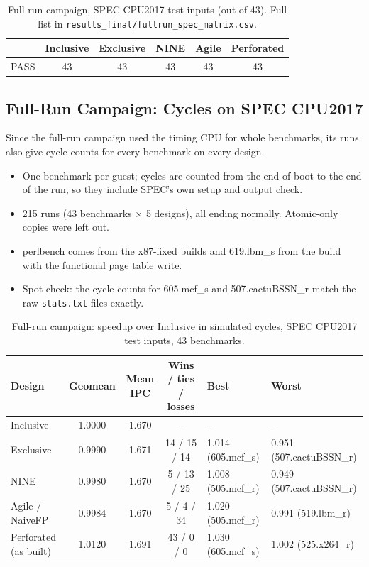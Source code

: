\begin{table}[H]
\centering
\small
\caption{Full-run campaign, SPEC CPU2017 test inputs (out of 43). Full list in \texttt{results\_final/fullrun\_spec\_matrix.csv}.}
\label{tab:fullrun_short}
\begin{tabular}{l c c c c c}
\toprule
 & \textbf{Inclusive} & \textbf{Exclusive} & \textbf{NINE} & \textbf{Agile} & \textbf{Perforated} \\
\midrule
PASS & 43 & 43 & 43 & 43 & 43 \\
\bottomrule
\end{tabular}
\end{table}

\subsection{Full-Run Campaign: Cycles on SPEC CPU2017}
\label{sec:fullrun_cycles}
Since the full-run campaign used the timing CPU for whole benchmarks, its runs also give cycle counts for every benchmark on every design.
\begin{itemize}
    \item One benchmark per guest; cycles are counted from the end of boot to the end of the run, so they include SPEC's own setup and output check.
    \item 215 runs (43 benchmarks $\times$ 5 designs), all ending normally. Atomic-only copies were left out.
    \item perlbench comes from the x87-fixed builds and 619.lbm\_s from the build with the functional page table write.
    \item Spot check: the cycle counts for 605.mcf\_s and 507.cactuBSSN\_r match the raw \texttt{stats.txt} files exactly.
\end{itemize}

\begin{table}[H]
\centering
\small
\caption{Full-run campaign: speedup over Inclusive in simulated cycles, SPEC CPU2017 test inputs, 43 benchmarks.}
\label{tab:fullrun_cycles}
\begin{tabular}{l c c c l l}
\toprule
\textbf{Design} & \textbf{Geomean} & \textbf{Mean IPC} & \textbf{Wins / ties / losses} & \textbf{Best} & \textbf{Worst} \\
\midrule
Inclusive & 1.0000 & 1.670 & -- & -- & -- \\
Exclusive & 0.9990 & 1.671 & 14 / 15 / 14 & 1.014 (605.mcf\_s) & 0.951 (507.cactuBSSN\_r) \\
NINE & 0.9980 & 1.670 & 5 / 13 / 25 & 1.008 (505.mcf\_r) & 0.949 (507.cactuBSSN\_r) \\
Agile / NaiveFP & 0.9984 & 1.670 & 5 / 4 / 34 & 1.020 (505.mcf\_r) & 0.991 (519.lbm\_r) \\
Perforated (as built) & 1.0120 & 1.691 & 43 / 0 / 0 & 1.030 (605.mcf\_s) & 1.002 (525.x264\_r) \\
\bottomrule
\end{tabular}
\end{table}

